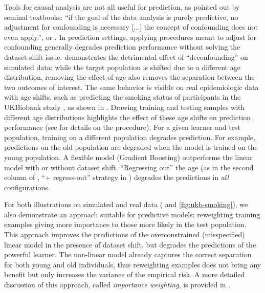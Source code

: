 \documentclass[twocolumn]{article}
\begin{document}
Tools for causal analysis are not all useful for prediction, 
as pointed out by seminal textbooks:
``if the
goal of the data analysis is purely predictive, no adjustment for confounding is
necessary [...] the concept of confounding does not even apply.''\citep[Sec.
18.1]{hernan2020causal}, or \citet{pearl2019seven}.
%
In prediction settings, applying procedures meant to adjust for confounding 
generally degrades prediction performance without solving the dataset
shift issue.
 demonstrates the detrimental effect of ``deconfounding''
on simulated data: while the target population is shifted due to a
different age distribution, removing the effect of age also removes
the separation between the two outcomes of interest.
%
The same behavior is visible on real epidemiologic data with age shifts,
such as predicting the
smoking status of participants in the UKBiobank study
\citep{sudlow2015uk}, as shown in .
Drawing training and testing samples with different age distributions
highlights the effect of these age shifts on prediction performance
(see  for details on the procedure). 
For a given learner and test population, training on a different population degrades prediction.
For example, predictions on the old population are degraded when the model is trained on the young population.
A flexible model (Gradient Boosting) outperforms the linear model with or without dataset shift.
``Regressing out'' the age (as in the second column of , ``+ regress-out'' strategy in ) degrades the predictions in \emph{all} configurations.

For both illustrations on simulated and real data (
and \ref{fig:ukb-smoking}), we also demonstrate an approach suitable for
predictive models: reweighting training examples giving more importance to those more likely in the test population.
This approach improves the predictions of the overconstrained (misspecified) linear model in the presence of dataset shift, but degrades the predictions of the powerful learner.
The non-linear model already captures the correct separation for both young and old individuals, thus reweighting examples does not bring any benefit but only increases the variance of the empirical risk.
A more detailed discussion of this approach, called \emph{importance weighting}, is provided in .
\end{document}
